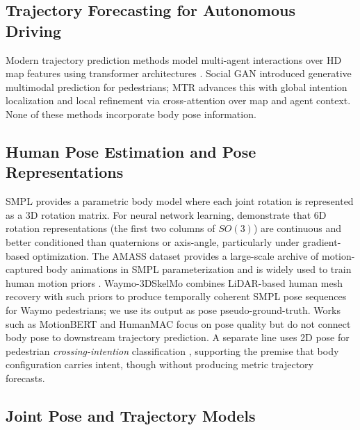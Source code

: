 \documentclass{article} %
\newcommand{\mtr}{\textsc{MTR}\xspace}
\begin{document}
\subsection{Trajectory Forecasting for Autonomous Driving}

Modern trajectory prediction methods model multi-agent interactions over HD map
features using transformer architectures
\citep{vaswani2017attention,shi2022mtr,shi2023mtrpp,yuan2021agentformer,
salzmann2020trajectron}. Social GAN \citep{gupta2018socialgan} introduced
generative multimodal prediction for pedestrians; \mtr
\citep{shi2022mtr} advances this with global intention localization and
local refinement via cross-attention over map and agent context.
None of these methods incorporate body pose information.

\subsection{Human Pose Estimation and Pose Representations}

SMPL \citep{loper2015smpl} provides a parametric body model where each joint
rotation is represented as a 3D rotation matrix. For neural network learning,
\citet{zhou2019continuity} demonstrate that 6D rotation representations (the
first two columns of $SO(3)$) are continuous and better conditioned than
quaternions or axis-angle, particularly under gradient-based optimization.
The AMASS dataset \citep{mahmood2019amass} provides a large-scale archive of
motion-captured body animations in SMPL parameterization and is widely used to
train human motion priors \citep{rempe2021humor,he2022nemf}.
Waymo-3DSkelMo \citep{zhu2025waymo3dskelmo} combines LiDAR-based human mesh
recovery \citep{fan2023lidarhmr} with such priors to produce temporally coherent
SMPL pose sequences for Waymo pedestrians; we use its output as pose
pseudo-ground-truth.
Works such as MotionBERT \citep{zhu2022motionbert} and HumanMAC
\citep{chen2023humanmac} focus on pose quality but do not connect body pose to
downstream trajectory prediction. A separate line uses 2D pose for pedestrian
\emph{crossing-intention} classification \citep{fang2018pedestrian,rasouli2019pie},
supporting the premise that body configuration carries intent, though without
producing metric trajectory forecasts.

\subsection{Joint Pose and Trajectory Models}
\end{document}
